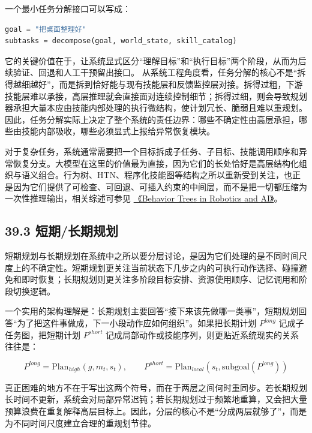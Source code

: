 一个最小任务分解接口可以写成：

\begin{lstlisting}[language=python]
goal = "把桌面整理好"
subtasks = decompose(goal, world_state, skill_catalog)
\end{lstlisting}

它的关键价值在于，让系统显式区分“理解目标”和“执行目标”两个阶段，从而为后续验证、回退和人工干预留出接口。 从系统工程角度看，任务分解的核心不是“拆得越细越好”，而是拆到恰好能与现有技能层和反馈监控层对接。拆得过粗，下游技能层难以承接，高层推理就会直接面对连续控制细节；拆得过细，则会导致规划器承担大量本应由技能内部处理的执行微结构，使计划冗长、脆弱且难以重规划。因此，任务分解实际上决定了整个系统的责任边界：哪些不确定性由高层承担，哪些由技能内部吸收，哪些必须显式上报给异常恢复模块。

对于复杂任务，系统通常需要把一个目标拆成子任务、子目标、技能调用顺序和异常恢复分支。大模型在这里的价值最为直接，因为它们的长处恰好是高层结构化组织与语义组合。行为树、HTN、程序化技能图等结构之所以重新受到关注，也正是因为它们提供了可检查、可回退、可插入约束的中间层，而不是把一切都压缩为一次性推理输出，相关综述可参见 \href{https://arxiv.org/abs/1709.00084}{《Behavior Trees in Robotics and AI》}。

\subsection*{39.3 短期/长期规划}


短期规划与长期规划在系统中之所以要分层讨论，是因为它们处理的是不同时间尺度上的不确定性。短期规划更关注当前状态下几步之内的可执行动作选择、碰撞避免和即时恢复；长期规划则更关注多阶段目标安排、资源使用顺序、记忆调用和阶段切换逻辑。

一个实用的架构理解是：长期规划主要回答“接下来该先做哪一类事”，短期规划回答“为了把这件事做成，下一小段动作应如何组织”。如果把长期计划 \(P^{long}\) 记成子任务图，把短期计划 \(P^{short}\) 记成局部动作或技能序列，则更贴近系统现实的关系往往是：

\begingroup
\scriptsize
\begin{equation*}
P^{long} = \mathrm{Plan}_{high}(g, m_t, s_t), \qquad
P^{short} = \mathrm{Plan}_{local}(s_t, \text{subgoal}(P^{long}))
\end{equation*}
\endgroup

真正困难的地方不在于写出这两个符号，而在于两层之间何时重同步。若长期规划长时间不更新，系统会对局部异常迟钝；若长期规划过于频繁地重算，又会把大量预算浪费在重复解释高层目标上。因此，分层的核心不是“分成两层就够了”，而是为不同时间尺度建立合理的重规划节律。

